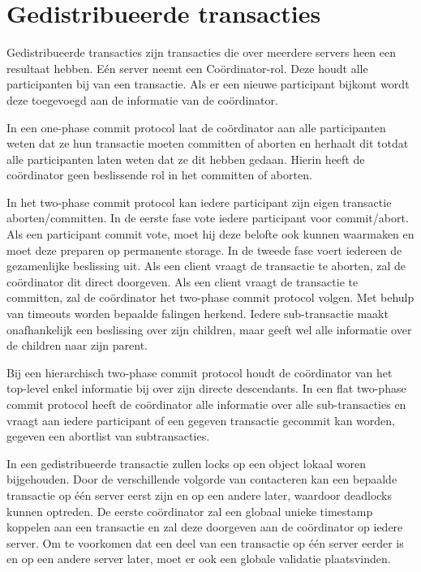 \documentclass[../samenvatting.tex]{subfiles}
\begin{document}
\chapter{Gedistribueerde transacties}
Gedistribueerde transacties zijn transacties die over meerdere servers heen een resultaat hebben. Eén server neemt een Coördinator-rol. Deze houdt alle participanten bij van een transactie. Als er een nieuwe participant bijkomt wordt deze toegevoegd aan de informatie van de coördinator.

In een one-phase commit protocol laat de coördinator aan alle participanten weten dat ze hun transactie moeten committen of aborten en herhaalt dit totdat alle participanten laten weten dat ze dit hebben gedaan. Hierin heeft de coördinator geen beslissende rol in het committen of aborten. 

In het two-phase commit protocol kan iedere participant zijn eigen transactie aborten/committen. In de eerste fase vote iedere participant voor commit/abort. Als een participant commit vote, moet hij deze belofte ook kunnen waarmaken en moet deze preparen op permanente storage. In de tweede fase voert iedereen de gezamenlijke beslissing uit. Als een client vraagt de transactie te aborten, zal de coördinator dit direct doorgeven. Als een client vraagt de transactie te committen, zal de coördinator het two-phase commit protocol volgen. Met behulp van timeouts worden bepaalde falingen herkend. Iedere sub-transactie maakt onafhankelijk een beslissing over zijn children, maar geeft wel alle informatie over de children naar zijn parent. 

Bij een hierarchisch two-phase commit protocol houdt de coördinator van het top-level enkel informatie bij over zijn directe descendants. In een flat two-phase commit protocol heeft de coördinator alle informatie over alle sub-transacties en vraagt aan iedere participant of een gegeven transactie gecommit kan worden, gegeven een abortlist van subtransacties. 

In een gedistribueerde transactie zullen locks op een object lokaal woren bijgehouden. Door de verschillende volgorde van contacteren kan een bepaalde transactie op één server eerst zijn en op een andere later, waardoor deadlocks kunnen optreden. De eerste coördinator zal een globaal unieke timestamp koppelen aan een transactie en zal deze doorgeven aan de coördinator op iedere server. Om te voorkomen dat een deel van een transactie op één server eerder is en op een andere server later, moet er ook een globale validatie plaatsvinden. 
\end{document}
